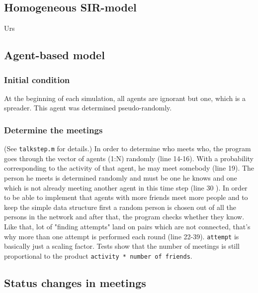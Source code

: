 \subsection{Homogeneous SIR-model}

Urs

\subsection{Agent-based model}

\subsubsection{Initial condition}

At the beginning of each simulation, all agents are ignorant but one, which is a spreader. This agent was determined pseudo-randomly.

\subsubsection{Determine the meetings}

(See \texttt{talkstep.m} for details.)
\newline
\newline
In order to determine who meets who, the program goes through the vector of agents (1:N) randomly (line 14-16). With a probability corresponding to the activity of that agent, he may meet somebody (line 19). The person he meets is determined randomly and must be one he knows and one which is not already meeting another agent in this time step (line 30 ). In order to be able to implement that agents with more friends meet more people and to keep the simple data structure first a random person is chosen out of all the persons in the network and after that, the program checks whether they know. Like that, lot of "finding attempts" land on pairs which are not connected, that's why more than one attempt is performed each round (line 22-39). \texttt{attempt} is basically just a scaling factor. Tests show that the number of meetings is still proportional to the product \texttt{activity * number of friends}.

\subsection{Status changes in meetings}


